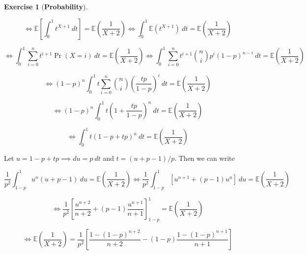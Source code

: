 \documentclass{article}
\theoremstyle{definition}
\newtheorem{exercise}{Exercise}
\theoremstyle{definition}
\theoremstyle{definition}
\theoremstyle{definition}
\theoremstyle{definition}
\newcommand{\E}{\mathbb{E}}
\begin{document}
\begin{exercise}[\textbf{Probability}]
\begin{enumerate}[(a)]
\[
 \iff \E \left[ \int_0^1 t^{X+1}  \ dt \right] = \E \left( \frac{1}{X+2} \right)  \iff \int_0^1 \E ( t^{X+1})  \ dt = \E \left( \frac{1}{X+2} \right)
\]

\[
\iff \int_0^1 \sum_{i=0}^n t^{i+1} \Pr(X = i) \ dt = \E \left( \frac{1}{X+2} \right) \iff \int_0^1 \sum_{i=0}^n t^{i+1} \binom{n}{i} p^i (1-p)^{n-i} \ dt = \E \left( \frac{1}{X+2} \right)
\]

\[
 \iff (1-p)^n \int_0^1 t\sum_{i=0}^n \binom{n}{i} \left( \frac{tp}{1-p} \right) ^i  \ dt = \E \left( \frac{1}{X+2} \right)
\]

\[
 \iff (1-p)^n \int_0^1t \left( 1 + \frac{tp}{1-p} \right)^n  \ dt = \E \left( \frac{1}{X+2} \right)
\]

\[
 \iff  \int_0^1 t\left( 1 - p + tp  \right)^n  \ dt = \E \left( \frac{1}{X+2} \right)
\]

Let \(u = 1 - p + tp \implies du = p \ dt\) and \(t = (u + p - 1)/p\). Then we can write

\[
\frac{1}{p^2} \int_{1-p}^1 u^n (u + p - 1) \ du = \E \left( \frac{1}{X+2} \right) \iff  \frac{1}{p^2} \int_{1-p}^1 [u^{n+1} + (p - 1)u^n] \ du = \E \left( \frac{1}{X+2} \right) 
\]

\[
\iff  \frac{1}{p^2} \left[\frac{u^{n+2}}{n+2} + (p - 1)\frac{u^{n+1}}{n+1} \right]_{1-p}^1 = \E \left( \frac{1}{X+2} \right) 
\]

\[
\iff   \E \left( \frac{1}{X+2} \right)  = \frac{1}{p^2} \left[\frac{1 - (1-p)^{n+2}}{n+2} - (1 - p)\frac{1 - (1-p)^{n+1}}{n+1} \right]
\]


\end{enumerate}
\end{exercise}
\end{document}
